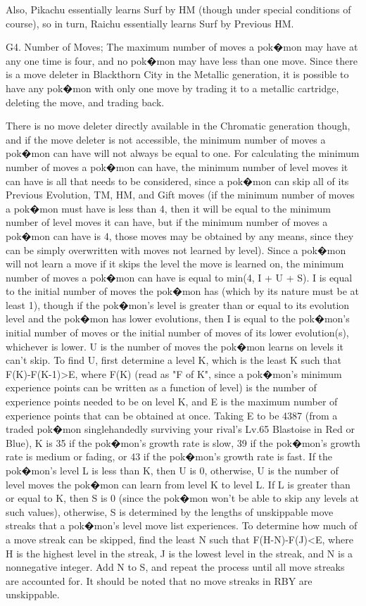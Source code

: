 \documentclass[reprint, aps, prl, paper=A4]{revtex4-1}
\begin{document}
Also, Pikachu essentially learns Surf by HM (though under special conditions of course), so in
turn, Raichu essentially learns Surf by Previous HM.


G4. Number of Moves;
The maximum number of moves a pok�mon may have at any one time is four, and no pok�mon may have
less than one move. Since there is a move deleter in Blackthorn City in the Metallic
generation, it is possible to have any pok�mon with only one move by trading it to a metallic
cartridge, deleting the move, and trading back.

There is no move deleter directly available in the Chromatic generation though, and if the move
deleter is not accessible, the minimum number of moves a pok�mon can have will not always be
equal to one. For calculating the minimum number of moves a pok�mon can have, the minimum
number of level moves it can have is all that needs to be considered, since a pok�mon can skip
all of its Previous Evolution, TM, HM, and Gift moves (if the minimum number of moves a pok�mon
must have is less than 4, then it will be equal to the minimum number of level moves it can
have, but if the minimum number of moves a pok�mon can have is 4, those moves may be obtained
by any means, since they can be simply overwritten with moves not learned by level). Since a
pok�mon will not learn a move if it skips the level the move is learned on, the minimum number
of moves a pok�mon can have is equal to min(4, I + U + S). I is equal to the initial number of
moves the pok�mon has (which by its nature must be at least 1), though if the pok�mon's level
is greater than or equal to its evolution level and the pok�mon has lower evolutions, then I is
equal to the pok�mon's initial number of moves or the initial number of moves of its lower
evolution(s), whichever is lower. U is the number of moves the pok�mon learns on levels it
can't skip. To find U, first determine a level K, which is the least K such that F(K)-F(K-1)>E,
where F(K) (read as "F of K", since a pok�mon's minimum experience points can be written as a
function of level) is the number of experience points needed to be on level K, and E is the
maximum number of experience points that can be obtained at once. Taking E to be 4387 (from a
traded pok�mon singlehandedly surviving your rival's Lv.65 Blastoise in Red or Blue), K is 35
if the pok�mon's growth rate is slow, 39 if the pok�mon's growth rate is medium or fading, or
43 if the pok�mon's growth rate is fast. If the pok�mon's level L is less than K, then U is 0,
otherwise, U is the number of level moves the pok�mon can learn from level K to level L. If L
is greater than or equal to K, then S is 0 (since the pok�mon won't be able to skip any levels
at such values), otherwise, S is determined by the lengths of unskippable move streaks that a
pok�mon's level move list experiences. To determine how much of a move streak can be skipped,
find the least N such that F(H-N)-F(J)<E, where H is the highest level in the streak, J is the
lowest level in the streak, and N is a nonnegative integer. Add N to S, and repeat the process
until all move streaks are accounted for. It should be noted that no move streaks in RBY are
unskippable.
\end{document}
